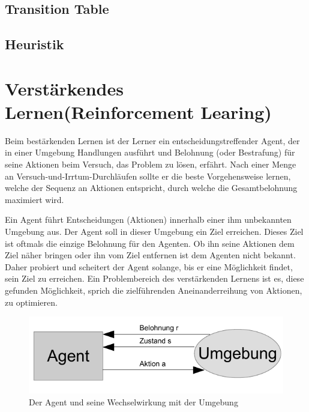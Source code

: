 
\subsection{Transition Table}


\subsection{Heuristik}

\section{Verstärkendes Lernen(Reinforcement Learing)}
Beim bestärkenden Lernen ist der Lerner ein entscheidungstreffender Agent, der in einer Umgebung Handlungen ausführt und Belohnung (oder Bestrafung) für seine Aktionen beim Versuch, das Problem zu lösen, erfährt. Nach einer Menge an Versuch-und-Irrtum-Durchläufen sollte er die beste Vorgehensweise lernen, welche der Sequenz an Aktionen entspricht, durch welche die Gesamtbelohnung maximiert wird\cite[397]{Alpaydin}.

Ein Agent führt Entscheidungen (Aktionen) innerhalb einer ihm unbekannten Umgebung aus. Der Agent soll in dieser Umgebung ein Ziel erreichen. Dieses Ziel ist oftmals die einzige Belohnung für den Agenten. Ob ihn seine Aktionen dem Ziel näher bringen oder ihn vom Ziel entfernen ist dem Agenten nicht bekannt. Daher probiert und scheitert der Agent solange, bis er eine Möglichkeit findet, sein Ziel zu erreichen. Ein Problembereich des verstärkenden Lernens ist es, diese gefunden Möglichkeit, sprich die zielführenden Aneinanderreihung von Aktionen, zu optimieren.

\begin{figure}[!htbp]
  \centering
  \includegraphics[scale = 1.4]{inhalt/abbildungen/agent_umgebung.pdf}
  \caption{Der Agent und seine Wechselwirkung mit der Umgebung}
  \label{fig:agent_umgebung}
\end{figure} 

